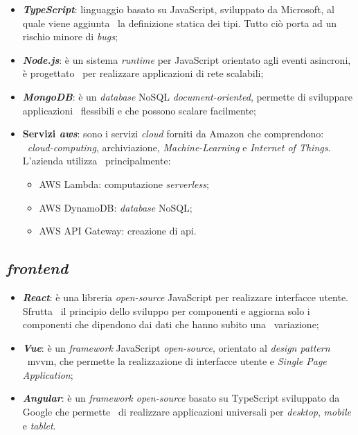 \begin{itemize}
  \item \textbf{\emph{TypeScript}}: linguaggio basato su JavaScript, sviluppato da Microsoft, al quale viene aggiunta \
  la definizione statica dei tipi. Tutto ciò porta ad un rischio minore di \emph{bugs};
  \item \textbf{\emph{Node.js}}: è un sistema \emph{runtime} per JavaScript orientato agli eventi asincroni, è progettato \
  per realizzare applicazioni di rete scalabili;
  \item \textbf{\emph{MongoDB}}: è un \emph{database} NoSQL \emph{document-oriented}, permette di sviluppare applicazioni \
  flessibili e che possono scalare facilmente;
  \item \textbf{Servizi \emph{\acrfull{aws}}}: sono i servizi \emph{cloud} forniti da Amazon che comprendono: \
  \emph{cloud-computing}, archiviazione, \emph{Machine-Learning} e \emph{Internet of Things}. L'azienda utilizza \
  principalmente: 
  \begin{itemize}
    \item AWS Lambda: computazione \emph{serverless};
    \item AWS DynamoDB: \emph{database} NoSQL;
    \item AWS API Gateway: creazione di \acrshort{api}.
  \end{itemize}
\end{itemize}

\subsection{\emph{\Gls{frontend}}}

\begin{itemize}
  \item \textbf{\emph{React}}: è una libreria \emph{\gls{open-source}} JavaScript per realizzare interfacce utente. Sfrutta \
  il principio dello sviluppo per componenti e aggiorna solo i componenti che dipendono dai dati che hanno subito una \
  variazione;
  \item \textbf{\emph{Vue}}: è un \emph{framework} JavaScript \emph{open-source}, orientato al \emph{design pattern} \
  \acrshort{mvvm}, che permette la realizzazione di interfacce utente e \emph{Single Page Application};
  \item \textbf{\emph{Angular}}: è un \emph{framework open-source} basato su TypeScript sviluppato da Google che permette \
  di realizzare applicazioni universali per \emph{desktop}, \emph{mobile} e \emph{tablet}.
\end{itemize}

